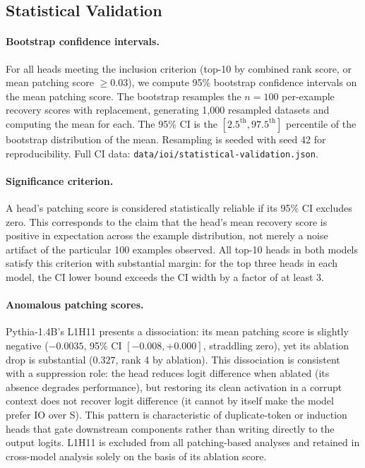 \documentclass[11pt,a4paper]{article}
\begin{document}
\subsection{Statistical Validation}
\label{sec:stats}

\paragraph{Bootstrap confidence intervals.}
For all heads meeting the inclusion criterion (top-10 by combined rank score, or mean
patching score $\geq 0.03$), we compute 95\% bootstrap confidence intervals on the
mean patching score. The bootstrap resamples the $n = 100$ per-example recovery scores
with replacement, generating 1{,}000 resampled datasets and computing the mean for
each. The 95\% CI is the $[2.5^{\text{th}}, 97.5^{\text{th}}]$ percentile of the
bootstrap distribution of the mean. Resampling is seeded with seed 42 for
reproducibility. Full CI data: \texttt{data/ioi/statistical-validation.json}.

\paragraph{Significance criterion.}
A head's patching score is considered statistically reliable if its 95\% CI excludes
zero. This corresponds to the claim that the head's mean recovery score is positive in
expectation across the example distribution, not merely a noise artifact of the
particular 100 examples observed. All top-10 heads in both models satisfy this
criterion with substantial margin: for the top three heads in each model, the CI lower
bound exceeds the CI width by a factor of at least 3.

\paragraph{Anomalous patching scores.}
Pythia-1.4B's L1H11 presents a dissociation: its mean patching score is slightly
negative ($-0.0035$, 95\% CI $[-0.008, +0.000]$, straddling zero), yet its ablation
drop is substantial ($0.327$, rank 4 by ablation). This dissociation is consistent
with a suppression role: the head reduces logit difference when ablated (its absence
degrades performance), but restoring its clean activation in a corrupt context does not
recover logit difference (it cannot by itself make the model prefer IO over S). This
pattern is characteristic of duplicate-token or induction heads that gate downstream
components rather than writing directly to the output logits. L1H11 is excluded from
all patching-based analyses and retained in cross-model analysis solely on the basis of
its ablation score.
\end{document}
